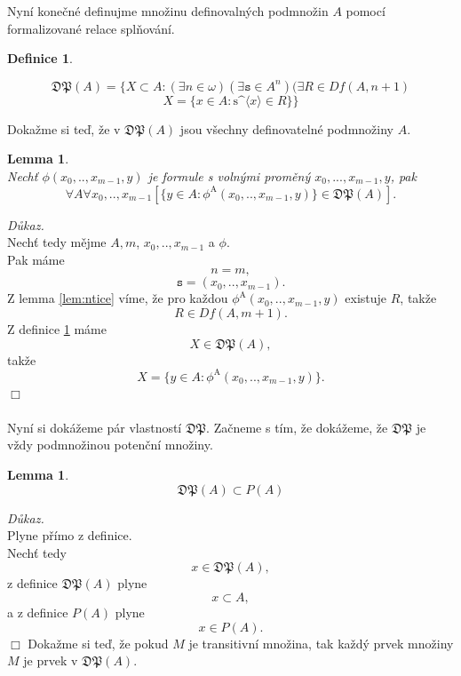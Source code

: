 \documentclass[12pt,a4paper]{article}
\newtheorem{lemma}[veta]{Lemma}
\newtheorem{definice}[veta]{Definice}
\newenvironment{proof}
{\noindent \textit{D\r{u}kaz.}}
{\hspace*{\fill} $\Box$}
\begin{document}
Nyn\'{i} kone\v{c}n\'{e} definujme mno\v{z}inu  definovaln\'{y}ch podmno\v{z}in $ A $ pomoc\'{i} formalizovan\'{e} relace spl\v{n}ov\'{a}n\'{i}. 
\begin{definice}~
\label{def:defi} 
\begin{center}
\[  \mathfrak{DP}(A)= \{ X \subset A: (\exists n \in \omega) (\exists \mathtt{s} \in A^n) (\exists R \in Df(A,n+1)   \]
\[ X=\{ x \in A: \text{s\textasciicircum}  \langle x \rangle \in R \}  \}      \]
\end{center}
\end{definice}
\newpage
Doka\v{z}me si te\v{d}, \v{z}e v $ \mathfrak{DP}(A) $ jsou v\v{s}echny definovateln\'{e} podmno\v{z}iny $ A $.
\begin{lemma}~\\
\label{lem:def}
Nech\v{t}  $ \phi(x_0,..,x_{m-1},y)  $ je formule s voln\'{y}mi prom\v{e}n\'{y} $ x_0,...,x_{m-1},y$, pak
\[ \forall A \forall x_0,..,x_{m-1} [\{ y \in A: \phi^\mathrm{A} (x_0,..,x_{m-1},y)\} \in  \mathfrak{DP}(A)]. \]
\end{lemma}
\begin{proof}~\\
Nech\v{t} tedy m\v{e}jme $  A,m $, $x_0,..,x_{m-1}$ a $ \phi$.\\ 
Pak m\'{a}me \[ n=m, \]
\[ \mathtt{s}=(x_0,..,x_{m-1}) .\] 
Z lemma \ref{lem:ntice} v\'{i}me, \v{z}e pro ka\v{z}dou $  \phi^\mathrm{A} (x_0,..,x_{m-1},y)$ existuje $ R $, tak\v{z}e \[ R \in Df(A,m+1) .\]
Z definice \ref{def:defi} m\'{a}me  \[ X \in \mathfrak{DP}(A),  \] tak\v{z}e
\[ X = \{ y \in A: \phi^\mathrm{A} (x_0,..,x_{m-1},y)\}. \]
\end{proof}~\\~\\
Nyn\'{i} si dok\'{a}\v{z}eme p\'{a}r vlastnost\'{i} $ \mathfrak{DP} $. Za\v{c}neme s t\'{i}m, \v{z}e dok\'{a}\v{z}eme, \v{z}e $ \mathfrak{DP} $ je v\v{z}dy podmno\v{z}inou poten\v{c}n\'{i} mno\v{z}iny.
\begin{lemma}
\label{lem:cast}
\[ \mathfrak{DP}(A) \subset P(A) \]
\end{lemma}
\begin{proof}~\\
Plyne p\v{r}\'{i}mo z definice. \\
 Nech\v{t} tedy  \[ x \in  \mathfrak{DP}(A) ,\]
 z definice  $ \mathfrak{DP}(A) $ plyne \[ x \subset A ,\] a z definice $ P(A) $ plyne \[  x \in P(A) . \]
 \end{proof}
\newpage
Doka\v{z}me si te\v{d}, \v{z}e pokud $ M $ je transitivn\'{i} mno\v{z}ina, tak ka\v{z}d\'{y} prvek mno\v{z}iny $ M $ je prvek v $ \mathfrak{DP}(A)$.
\end{document}
